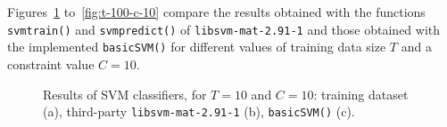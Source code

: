 \documentclass[paper=a4, fontsize=11pt]{scrartcl} %
\numberwithin{equation}{section} %
\numberwithin{figure}{section} %
\numberwithin{table}{section} %
\newcommand{\vertbreak}{\vspace{1.75 mm}}
\begin{document}
Figures~\ref{fig:t-10-c-10} to~\ref{fig:t-100-c-10} compare the results obtained 
with the functions \verb+svmtrain()+ and \verb+svmpredict()+ of 
\verb+libsvm-mat-2.91-1+ and those obtained with the implemented 
\verb+basicSVM()+ for different values of training data size $T$ and a 
constraint value $C=10$.\vertbreak

\begin{figure}[H]
    \centering




    \cprotect\caption{Results of SVM classifiers, for $T = 10$ and $C = 10$: 
            training dataset (a),
            third-party \verb+libsvm-mat-2.91-1+ (b), \verb+basicSVM()+ (c).}
    \label{fig:t-10-c-10}

\end{figure}
\end{document}
